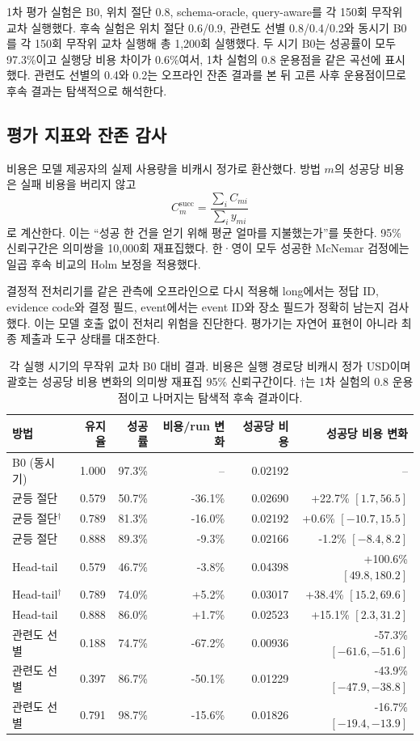 \documentclass[10pt,twocolumn]{article}
\begin{document}
1차 평가 실험은 B0, 위치 절단 0.8, schema-oracle, query-aware를 각 150회
무작위 교차 실행했다. 후속 실험은 위치 절단 0.6/0.9, 관련도 선별 0.8/0.4/0.2와
동시기 B0를 각 150회 무작위 교차 실행해 총 1,200회 실행했다. 두 시기 B0는 성공률이
모두 97.3\%이고 실행당 비용 차이가 0.6\%여서, 1차 실험의 0.8 운용점을 같은
곡선에 표시했다. 관련도 선별의 0.4와 0.2는 오프라인 잔존 결과를 본 뒤 고른
사후 운용점이므로 후속 결과는 탐색적으로 해석한다.

\subsection{평가 지표와 잔존 감사}
비용은 모델 제공자의 실제 사용량을 비캐시 정가로 환산했다. 방법 $m$의 성공당
비용은 실패 비용을 버리지 않고
\begin{equation}
 C^{\mathrm{succ}}_m=\frac{\sum_i C_{mi}}{\sum_i y_{mi}}
\end{equation}
로 계산한다. 이는 ``성공 한 건을 얻기 위해 평균 얼마를 지불했는가''를 뜻한다.
95\% 신뢰구간은 의미쌍을 10,000회 재표집했다. 한·영이 모두 성공한
McNemar 검정에는 일곱 후속 비교의 Holm 보정을 적용했다.

결정적 전처리기를 같은 관측에 오프라인으로 다시 적용해 long에서는 정답 ID,
evidence code와 결정 필드, event에서는 event ID와 장소 필드가 정확히 남는지
검사했다. 이는 모델 호출 없이 전처리 위험을 진단한다. 평가기는 자연어 표현이
아니라 최종 제출과 도구 상태를 대조한다.

\begin{table}[t]
\centering
\caption{각 실행 시기의 무작위 교차 B0 대비 결과. 비용은 실행 경로당 비캐시
정가 USD이며 괄호는 성공당 비용 변화의 의미쌍 재표집 95\% 신뢰구간이다.
$\dagger$는 1차 실험의 0.8 운용점이고 나머지는 탐색적 후속 결과이다.}
\label{tab:main}
\small
\begin{tabular}{@{}lrrrrr@{}}
\toprule
방법 & 유지율 & 성공률 & 비용/run 변화 & 성공당 비용 & 성공당 비용 변화 \\
\midrule
B0 (동시기) & 1.000 & 97.3\% & -- & 0.02192 & -- \\
균등 절단 & 0.579 & 50.7\% & -36.1\% & 0.02690 & +22.7\% $[1.7,56.5]$ \\
균등 절단$^\dagger$ & 0.789 & 81.3\% & -16.0\% & 0.02192 & +0.6\% $[-10.7,15.5]$ \\
균등 절단 & 0.888 & 89.3\% & -9.3\% & 0.02166 & -1.2\% $[-8.4,8.2]$ \\
Head-tail & 0.579 & 46.7\% & -3.8\% & 0.04398 & +100.6\% $[49.8,180.2]$ \\
Head-tail$^\dagger$ & 0.789 & 74.0\% & +5.2\% & 0.03017 & +38.4\% $[15.2,69.6]$ \\
Head-tail & 0.888 & 86.0\% & +1.7\% & 0.02523 & +15.1\% $[2.3,31.2]$ \\
관련도 선별 & 0.188 & 74.7\% & -67.2\% & 0.00936 & -57.3\% $[-61.6,-51.6]$ \\
관련도 선별 & 0.397 & 86.7\% & -50.1\% & 0.01229 & -43.9\% $[-47.9,-38.8]$ \\
관련도 선별 & 0.791 & 98.7\% & -15.6\% & 0.01826 & -16.7\% $[-19.4,-13.9]$ \\
\bottomrule
\end{tabular}
\end{table}
\end{document}
